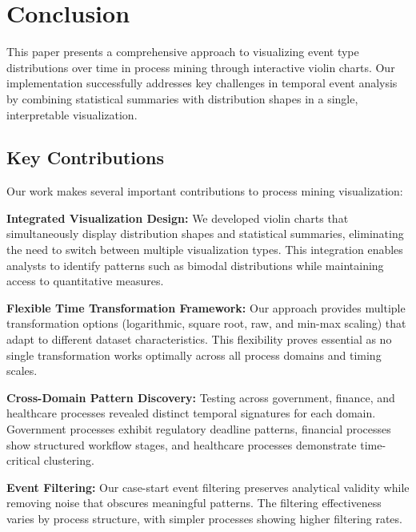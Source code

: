 
\section{Conclusion}
\label{sec:conclusion}

This paper presents a comprehensive approach to visualizing event type distributions over time in process mining through interactive violin charts. Our implementation successfully addresses key challenges in temporal event analysis by combining statistical summaries with distribution shapes in a single, interpretable visualization.

\subsection{Key Contributions}
\label{subsec:contributions}

Our work makes several important contributions to process mining visualization:

\textbf{Integrated Visualization Design:} We developed violin charts that simultaneously display distribution shapes and statistical summaries, eliminating the need to switch between multiple visualization types. This integration enables analysts to identify patterns such as bimodal distributions while maintaining access to quantitative measures.

\textbf{Flexible Time Transformation Framework:} Our approach provides multiple transformation options (logarithmic, square root, raw, and min-max scaling) that adapt to different dataset characteristics. This flexibility proves essential as no single transformation works optimally across all process domains and timing scales.

\textbf{Cross-Domain Pattern Discovery:} Testing across government, finance, and healthcare processes revealed distinct temporal signatures for each domain. Government processes exhibit regulatory deadline patterns, financial processes show structured workflow stages, and healthcare processes demonstrate time-critical clustering.

\textbf{Event Filtering:} Our case-start event filtering preserves analytical validity while removing noise that obscures meaningful patterns. The filtering effectiveness varies by process structure, with simpler processes showing higher filtering rates.


